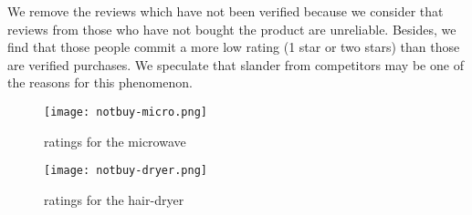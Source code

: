 \documentclass{mcmthesis}
\begin{document}
We remove the reviews which have not been verified because we consider that reviews from those who have not bought the product are unreliable. Besides, we find that those people commit a more low rating (1 star or two stars) than those are verified purchases. We speculate that slander from competitors may be one of the reasons for this phenomenon.

\begin{figure}[h]
  \small
  \centering
  \texttt{[image: notbuy-micro.png]}
  \caption{ratings for the microwave}
\end{figure}

\begin{figure}[h]
  \small
  \centering
  \texttt{[image: notbuy-dryer.png]}
  \caption{ratings for the hair-dryer}
\end{figure}
\end{document}
